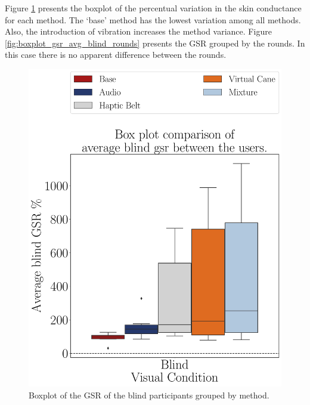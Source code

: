 Figure \ref{fig:boxplot_gsr_avg_blind_scene} presents the boxplot of the percentual variation in the skin conductance for each method. The ‘base’ method has the lowest variation among all methods. Also, the introduction of vibration increases the method variance. Figure \ref{fig:boxplot_gsr_avg_blind_rounds} presents the GSR grouped by the rounds. In this case there is no apparent difference between the rounds.

\begin{figure}[!htb]
    \centering
    \begin{minipage}{0.45\textwidth}
        \centering
        \includegraphics[width = \textwidth]{Resultados/GSR/Figuras/pdf/boxplot_gsr_avg_blind_scene.pdf}
        \caption{Boxplot of the GSR of the blind participants grouped by method.}
        \label{fig:boxplot_gsr_avg_blind_scene}
    \end{minipage}
    \begin{minipage}{0.075\textwidth}
        \hfill
    \end{minipage}
    \begin{minipage}{0.45\textwidth}

\end{minipage}
\end{figure}
